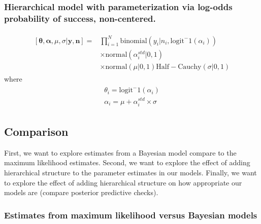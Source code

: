 \documentclass[12pt, oneside, titlepage]{article}   	%
\begin{document}
\subsubsection*{Hierarchical model with parameterization via log-odds probability of success, non-centered.}
\begin{align}
  \begin{split}
[\bm{\theta},\bm{\alpha},\mu,\sigma|\bm{y},\bm{n}]  = & \prod_{i=1}^N \mathrm{binomial}(y_{i}|n_{i},\mathrm{logit}^-1(\alpha_i)) 
    \\ & \times \mathrm{normal} (  \alpha^{std}_i | 0 , 1 )
    \\ & \times \mathrm{normal} ( \mu | 0, 1) \mathrm{Half-Cauchy} ( \sigma | 0, 1 ) 
   \end{split}
\end{align}
where
\begin{align}
  \begin{split}
\theta_i = \mathrm{logit}^-1(\alpha_i) \\
\alpha_i = \mu + \alpha^{std}_{i} \times \sigma
   \end{split}
\end{align}

\subsection*{Comparison}

First, we want to explore estimates from a Bayesian model compare to the maximum likelihood estimates. Second, we want to explore the effect of adding hierarchical structure to the parameter estimates in our models. Finally, we want to explore the effect of adding hierarchical structure on how appropriate our models are (compare posterior predictive checks).

\subsubsection*{Estimates from maximum likelihood versus Bayesian models} 
\end{document}
